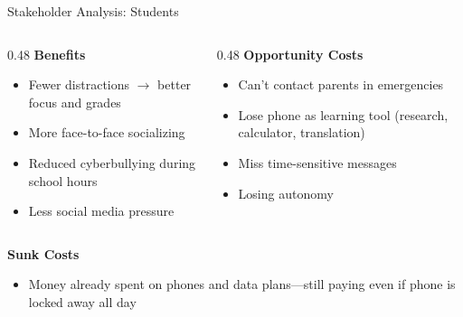 \documentclass[9pt,english,aspectratio=169]{beamer}
\begin{document}
\begin{frame}{Stakeholder Analysis: Students}

  \begin{columns}[T]
    \begin{column}{0.48\textwidth}
      \textbf{\textcolor{green!60!black}{Benefits}}
      \begin{itemize}\small
        \item Fewer distractions $\rightarrow$ better focus and grades
        \item More face-to-face socializing
        \item Reduced cyberbullying during school hours
        \item Less social media pressure
      \end{itemize}
    \end{column}
    \begin{column}{0.48\textwidth}
      \textbf{\textcolor{vermillion}{Opportunity Costs}}
      \begin{itemize}\small
        \item Can't contact parents in emergencies
        \item Lose phone as learning tool (research, calculator, translation)
        \item Miss time-sensitive messages
        \item Losing autonomy
      \end{itemize}
    \end{column}
  \end{columns}

  \vspace{0.6em}
  \textbf{Sunk Costs}
  \begin{itemize}\small
    \item Money already spent on phones and data plans---still paying even if phone is locked away all day
  \end{itemize}

\end{frame}
\end{document}
